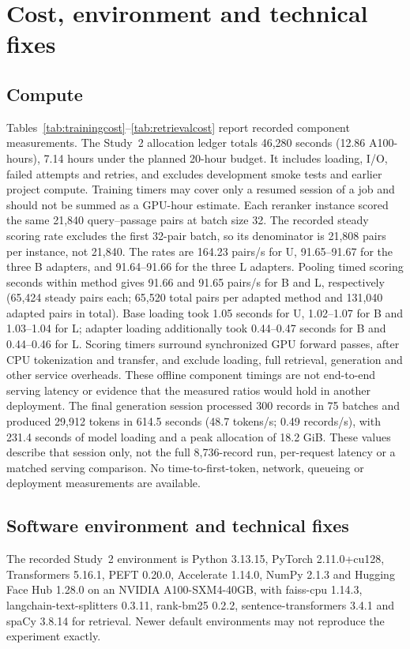 \section{Cost, environment and technical fixes}\label{supp:cost}
\subsection{Compute}
Tables~\ref{tab:trainingcost}--\ref{tab:retrievalcost} report recorded component measurements. The Study~2 allocation ledger totals 46,280 seconds (12.86 A100-hours), 7.14 hours under the planned 20-hour budget. It includes loading, I/O, failed attempts and retries, and excludes development smoke tests and earlier project compute. Training timers may cover only a resumed session of a job and should not be summed as a GPU-hour estimate.
\FloatBarrier
\FloatBarrier
\FloatBarrier
Each reranker instance scored the same 21,840 query--passage pairs at batch size 32. The recorded steady scoring rate excludes the first 32-pair batch, so its denominator is 21,808 pairs per instance, not 21,840. The rates are 164.23 pairs/s for U, 91.65--91.67 for the three B adapters, and 91.64--91.66 for the three L adapters. Pooling timed scoring seconds within method gives 91.66 and 91.65 pairs/s for B and L, respectively (65,424 steady pairs each; 65,520 total pairs per adapted method and 131,040 adapted pairs in total). Base loading took 1.05 seconds for U, 1.02--1.07 for B and 1.03--1.04 for L; adapter loading additionally took 0.44--0.47 seconds for B and 0.44--0.46 for L. Scoring timers surround synchronized GPU forward passes, after CPU tokenization and transfer, and exclude loading, full retrieval, generation and other service overheads. These offline component timings are not end-to-end serving latency or evidence that the measured ratios would hold in another deployment.
The final generation session processed 300 records in 75 batches and produced 29,912 tokens in 614.5 seconds (48.7 tokens/s; 0.49 records/s), with 231.4 seconds of model loading and a peak allocation of 18.2 GiB. These values describe that session only, not the full 8,736-record run, per-request latency or a matched serving comparison. No time-to-first-token, network, queueing or deployment measurements are available.

\subsection{Software environment and technical fixes}
The recorded Study~2 environment is Python 3.13.15, PyTorch 2.11.0+cu128, Transformers 5.16.1, PEFT 0.20.0, Accelerate 1.14.0, NumPy 2.1.3 and Hugging Face Hub 1.28.0 on an NVIDIA A100-SXM4-40GB, with faiss-cpu 1.14.3, langchain-text-splitters 0.3.11, rank-bm25 0.2.2, sentence-transformers 3.4.1 and spaCy 3.8.14 for retrieval. Newer default environments may not reproduce the experiment exactly.

